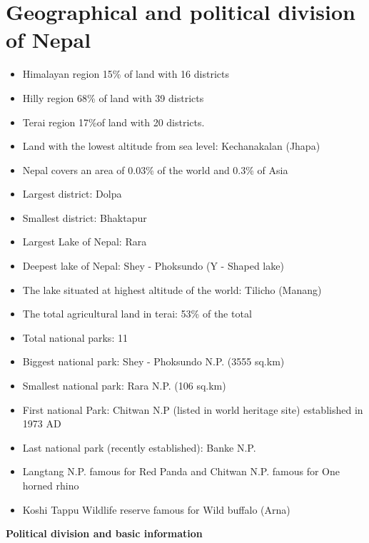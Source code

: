 \documentclass[
  openany]{book}
\providecommand{\tightlist}{%
  \setlength{\itemsep}{0pt}\setlength{\parskip}{0pt}}
\begin{document}
\hypertarget{geographical-and-political-division-of-nepal}{%
\section{Geographical and political division of Nepal}\label{geographical-and-political-division-of-nepal}}

\begin{itemize}
\tightlist
\item
  Himalayan region 15\% of land with 16 districts
\item
  Hilly region 68\% of land with 39 districts
\item
  Terai region 17\%of land with 20 districts.
\item
  Land with the lowest altitude from sea level: Kechanakalan (Jhapa)
\item
  Nepal covers an area of 0.03\% of the world and 0.3\% of Asia
\item
  Largest district: Dolpa
\item
  Smallest district: Bhaktapur
\item
  Largest Lake of Nepal: Rara
\item
  Deepest lake of Nepal: Shey - Phoksundo (Y - Shaped lake)
\item
  The lake situated at highest altitude of the world: Tilicho (Manang)
\item
  The total agricultural land in terai: 53\% of the total
\item
  Total national parks: 11
\item
  Biggest national park: Shey - Phoksundo N.P. (3555 sq.km)
\item
  Smallest national park: Rara N.P. (106 sq.km)
\item
  First national Park: Chitwan N.P (listed in world heritage site) established in 1973 AD
\item
  Last national park (recently established): Banke N.P.
\item
  Langtang N.P. famous for Red Panda and Chitwan N.P. famous for One horned rhino
\item
  Koshi Tappu Wildlife reserve famous for Wild buffalo (Arna)
\end{itemize}

\textbf{Political division and basic information}
\end{document}
